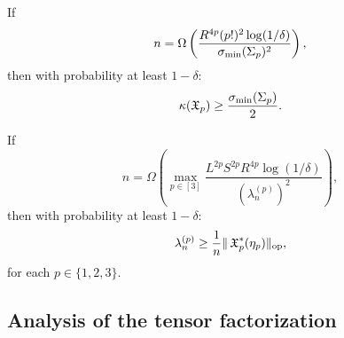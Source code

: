 

\begin{lemma}
\label{lem:lowRankLower}
If $$n = \Omega \left(\frac{R^{4p} (p!)^2 \log(1/\delta)}{\sigma_\text{\rm min}(\Sigma_p)^2} \right),$$
then with probability at least $1-\delta$:
$$\kappa(\operatorname{\mathfrak{X}}_p) \ge \frac{\sigma_\text{\rm min}(\Sigma_p)}{2}.$$
\end{lemma}


\begin{lemma}
\label{lem:lowRankUpper}
If $$n = \Omega \left(\max_{p\in [3]} \frac{L^{2p} S^{2p} R^{4p} \log(1/\delta)}{\left(\lambda_n^{(p)}\right)^2} \right),$$
then with probability at least $1-\delta$:
$$\lambda_n^{(p)} \ge \frac1{n} \|\operatorname{\mathfrak{X}}_p^*(\eta_p)\|_{\text{\rm op}},$$
for each $p \in \{1,2,3\}$.
\end{lemma}

\subsection{Analysis of the tensor factorization} 
\label{sec:tensorError}

